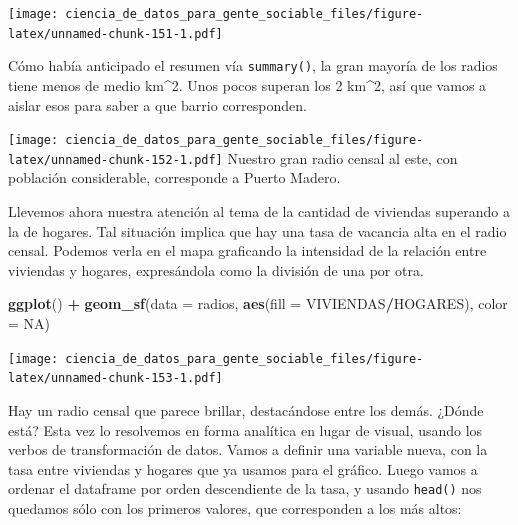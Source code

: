 \documentclass[]{book}
\newenvironment{Shaded}{\begin{snugshade}}{\end{snugshade}}
\newcommand{\KeywordTok}[1]{\textcolor[rgb]{0.13,0.29,0.53}{\textbf{#1}}}
\newcommand{\DataTypeTok}[1]{\textcolor[rgb]{0.13,0.29,0.53}{#1}}
\newcommand{\DecValTok}[1]{\textcolor[rgb]{0.00,0.00,0.81}{#1}}
\newcommand{\StringTok}[1]{\textcolor[rgb]{0.31,0.60,0.02}{#1}}
\newcommand{\OtherTok}[1]{\textcolor[rgb]{0.56,0.35,0.01}{#1}}
\newcommand{\OperatorTok}[1]{\textcolor[rgb]{0.81,0.36,0.00}{\textbf{#1}}}
\newcommand{\NormalTok}[1]{#1}
\begin{document}
\texttt{[image: ciencia\_de\_datos\_para\_gente\_sociable\_files/figure-latex/unnamed-chunk-151-1.pdf]}

Cómo había anticipado el resumen vía \texttt{summary()}, la gran mayoría
de los radios tiene menos de medio km\^{}2. Unos pocos superan los 2
km\^{}2, así que vamos a aislar esos para saber a que barrio
corresponden.

\begin{Shaded}
\end{Shaded}

\texttt{[image: ciencia\_de\_datos\_para\_gente\_sociable\_files/figure-latex/unnamed-chunk-152-1.pdf]}
Nuestro gran radio censal al este, con población considerable,
corresponde a Puerto Madero.

Llevemos ahora nuestra atención al tema de la cantidad de viviendas
superando a la de hogares. Tal situación implica que hay una tasa de
vacancia alta en el radio censal. Podemos verla en el mapa graficando la
intensidad de la relación entre viviendas y hogares, expresándola como
la división de una por otra.

\begin{Shaded}
\begin{Highlighting}[]
\KeywordTok{ggplot}\NormalTok{() }\OperatorTok{+}\StringTok{ }\KeywordTok{geom_sf}\NormalTok{(}\DataTypeTok{data =}\NormalTok{ radios, }\KeywordTok{aes}\NormalTok{(}\DataTypeTok{fill =}\NormalTok{ VIVIENDAS}\OperatorTok{/}\NormalTok{HOGARES), }\DataTypeTok{color =} \OtherTok{NA}\NormalTok{)}
\end{Highlighting}
\end{Shaded}

\texttt{[image: ciencia\_de\_datos\_para\_gente\_sociable\_files/figure-latex/unnamed-chunk-153-1.pdf]}

Hay un radio censal que parece brillar, destacándose entre los demás.
¿Dónde está? Esta vez lo resolvemos en forma analítica en lugar de
visual, usando los verbos de transformación de datos. Vamos a definir
una variable nueva, con la tasa entre viviendas y hogares que ya usamos
para el gráfico. Luego vamos a ordenar el dataframe por orden
descendiente de la tasa, y usando \texttt{head()} nos quedamos sólo con
los primeros valores, que corresponden a los más altos:
\end{document}
